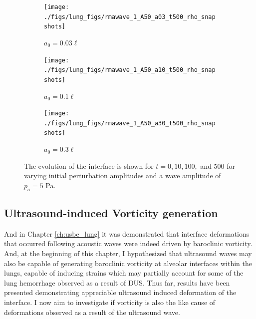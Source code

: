 \begin{figure}
  \vspace*{-0.5cm}
  \centering
  \begin{subfigure}[b]{0.9\textwidth}
    \texttt{[image: ./figs/lung\_figs/rmawave\_1\_A50\_a03\_t500\_rho\_snapshots]}
    \caption{\label{fig:rho_snapshot_A50_a03} $a_0 = 0.03\ell$}
  \end{subfigure}
  \begin{subfigure}[b]{0.9\textwidth}
    \texttt{[image: ./figs/lung\_figs/rmawave\_1\_A50\_a10\_t500\_rho\_snapshots]}
    \caption{\label{fig:rho_snapshot_A50_a10} $a_0 = 0.1\ell$}
  \end{subfigure}
  \begin{subfigure}[b]{0.9\textwidth}
    \texttt{[image: ./figs/lung\_figs/rmawave\_1\_A50\_a30\_t500\_rho\_snapshots]}
    \caption{\label{fig:rho_snapshot_A50_a30} $a_0 = 0.3\ell$}
  \end{subfigure}
  \caption{The evolution of the interface is shown for $t=0, 10, 100,$
    and $500$ for varying initial perturbation amplitudes and a wave amplitude of $p_a=5$ Pa.}
  \label{fig:rho_snapshots_A50}
\end{figure}
%
%
\subsection{Ultrasound-induced Vorticity generation}
And in Chapter \ref{ch:usbe_lung} it was demonstrated that interface
deformations that occurred following acoustic waves were indeed driven
by baroclinic vorticity. And, at the beginning of this chapter, I
hypothesized that ultrasound waves may also be capable of generating
baroclinic vorticity at alveolar interfaces within the lungs, capable
of inducing strains which may partially account for some of the lung
hemorrhage observed as a result of \ac{DUS}. Thus far, results have
been presented demonstrating appreciable ultrasound induced
deformation of the interface. I now aim to investigate if vorticity is
also the like cause of deformations observed as a result of the
ultrasound wave.

